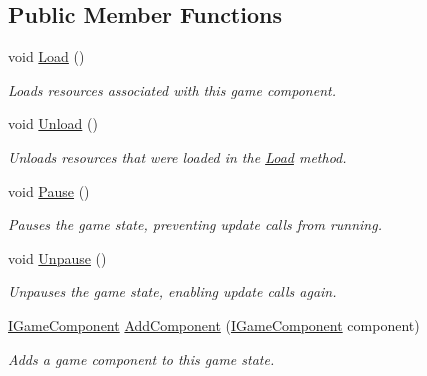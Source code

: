 \subsection*{Public Member Functions}
\begin{DoxyCompactItemize}
\item 
void \hyperlink{interface_tri_devs_1_1_tri_engine2_d_1_1_state_management_1_1_i_game_state_aace826890dbeec95fd94b87aaafab44c}{Load} ()
\begin{DoxyCompactList}\small\item\em Loads resources associated with this game component. \end{DoxyCompactList}\item 
void \hyperlink{interface_tri_devs_1_1_tri_engine2_d_1_1_state_management_1_1_i_game_state_acaaa2c41c58ee6818a5d599c50e7235c}{Unload} ()
\begin{DoxyCompactList}\small\item\em Unloads resources that were loaded in the \hyperlink{interface_tri_devs_1_1_tri_engine2_d_1_1_state_management_1_1_i_game_state_aace826890dbeec95fd94b87aaafab44c}{Load} method. \end{DoxyCompactList}\item 
void \hyperlink{interface_tri_devs_1_1_tri_engine2_d_1_1_state_management_1_1_i_game_state_a09d23db483ddc6a6624c1410e2d67d60}{Pause} ()
\begin{DoxyCompactList}\small\item\em Pauses the game state, preventing update calls from running. \end{DoxyCompactList}\item 
void \hyperlink{interface_tri_devs_1_1_tri_engine2_d_1_1_state_management_1_1_i_game_state_aa6342203830c78f40da399c4c37de2da}{Unpause} ()
\begin{DoxyCompactList}\small\item\em Unpauses the game state, enabling update calls again. \end{DoxyCompactList}\item 
\hyperlink{interface_tri_devs_1_1_tri_engine2_d_1_1_interfaces_1_1_i_game_component}{I\-Game\-Component} \hyperlink{interface_tri_devs_1_1_tri_engine2_d_1_1_state_management_1_1_i_game_state_adea1c0ea51ca39191fd9d30bbb49c3c7}{Add\-Component} (\hyperlink{interface_tri_devs_1_1_tri_engine2_d_1_1_interfaces_1_1_i_game_component}{I\-Game\-Component} component)
\begin{DoxyCompactList}\small\item\em Adds a game component to this game state. \end{DoxyCompactList}\item 

\end{DoxyCompactItemize}
